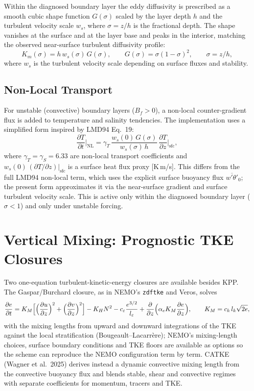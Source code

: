 \documentclass[11pt,twoside]{report}
\newcommand{\pp}{\partial}
\begin{document}
Within the diagnosed boundary layer the eddy diffusivity is prescribed as
a smooth cubic shape function $G(\sigma)$ scaled by the layer depth $h$
and the turbulent velocity scale $w_s$, where $\sigma=z/h$ is the
fractional depth.  The shape vanishes at the surface and at the layer base
and peaks in the interior, matching the observed near-surface turbulent
diffusivity profile:
\begin{equation}
  K_m(\sigma) = h\,w_s(\sigma)\,G(\sigma),
  \qquad G(\sigma) = \sigma(1-\sigma)^2,
  \qquad \sigma=z/h,
\end{equation}
where $w_s$ is the turbulent velocity scale depending on surface fluxes
and stability.

\subsection{Non-Local Transport}

For unstable (convective) boundary layers ($B_f>0$), a non-local
counter-gradient flux is added to temperature and salinity tendencies.
The implementation uses a simplified form inspired by LMD94 Eq.~19:
\begin{equation}
  \frac{\pp T}{\pp t}\bigg|_{\mathrm{NL}} =
  \gamma_T\,\frac{w_s(0)\,G(\sigma)}{w_s(\sigma)\,h}\,
  \frac{\pp T}{\pp z}\bigg|_{\mathrm{sfc}},
\end{equation}
where $\gamma_T=\gamma_S=6.33$ are non-local transport coefficients
and $w_s(0)\,(\pp T/\pp z)|_{\mathrm{sfc}}$ is a surface heat flux
proxy [K\,m/s].  This differs from the full LMD94 non-local term, which
uses the explicit surface buoyancy flux $\overline{w'\theta'}_0$;
the present form approximates it via the near-surface gradient
and surface turbulent velocity scale.
This is active only within the diagnosed boundary layer ($\sigma<1$)
and only under unstable forcing.


\section{Vertical Mixing: Prognostic TKE Closures}
\label{sec:ocean-tke}

Two one-equation turbulent-kinetic-energy closures are available besides KPP.
The Gaspar/Burchard closure, as in NEMO's \texttt{zdftke} and Veros, solves
\begin{equation}
  \frac{\pp e}{\pp t}=K_M\Bigl[\Bigl(\frac{\pp u}{\pp z}\Bigr)^2
  +\Bigl(\frac{\pp v}{\pp z}\Bigr)^2\Bigr]-K_HN^2
  -c_\varepsilon\frac{e^{3/2}}{l_\varepsilon}
  +\frac{\pp}{\pp z}\Bigl(\alpha_e K_M\frac{\pp e}{\pp z}\Bigr),
  \qquad K_M=c_k\,l_k\sqrt{2e},
\end{equation}
with the mixing lengths from upward and downward integrations of the TKE
against the local stratification (Bougeault--Lacarr\`ere); NEMO's mixing-length
choices, surface boundary conditions and TKE floors are available as options so
the scheme can reproduce the NEMO configuration term by term.  CATKE
(Wagner et al.\ 2025) derives instead a dynamic convective mixing length from
the convective buoyancy flux and blends stable, shear and convective regimes with
separate coefficients for momentum, tracers and TKE.
\end{document}

